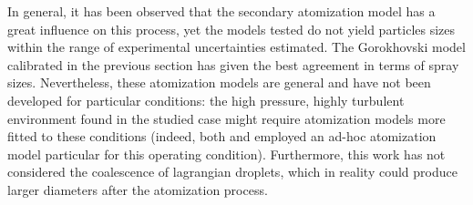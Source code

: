 In general, it has been observed that the secondary atomization model has a great influence on this process, yet the models tested do not yield particles sizes within the range of experimental uncertainties estimated. The Gorokhovski model calibrated in the previous section has given the best agreement in terms of spray sizes. Nevertheless, these atomization models are general and have not been developed for particular conditions: the high pressure, highly turbulent environment found in the studied case might require atomization models more fitted to these conditions (indeed, both  and  employed an ad-hoc atomization model particular for this operating condition). Furthermore, this work has not considered the coalescence of lagrangian droplets, which in reality could produce larger diameters after the atomization process.



